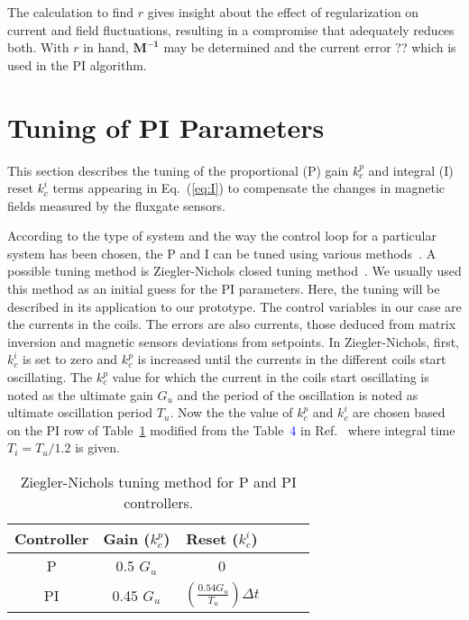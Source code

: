 The calculation to find $r$ gives insight about the effect of regularization on current and field fluctuations, resulting in a compromise that adequately reduces both. With $r$ in hand, $\bm{M^{-1}}$ may be determined and the current error  ?? which is used in the PI algorithm.

\section{Tuning of PI Parameters}\label{sec:tune}
This section describes the tuning of the proportional (P) gain $k_c^p$ and integral (I) reset $k_c^i$ terms appearing in Eq.~(\ref{eq:I}) to compensate the changes in magnetic fields measured by the fluxgate sensors.

According to the type of system and the way the control loop for a particular system has been chosen, the P and I can be tuned using various methods~\cite{tuning}. A possible tuning method is Ziegler-Nichols closed tuning method~\cite{tuning_ZN}. We usually used this method as an initial guess for the PI parameters. Here, the tuning will be described in its application to our prototype. The control variables in our case are the currents in the coils. The errors are also currents, those deduced from matrix inversion and magnetic sensors deviations from setpoints. In Ziegler-Nichols, first, $k_c^i$ is set to zero and $k_c^p$ is increased until the currents in the different coils start oscillating. The $k_c^p$ value for which the current in the coils start oscillating is noted as the ultimate gain $G_{u}$ and the period of the oscillation is noted as ultimate oscillation period $T_u$. Now the the value of $k_c^p$ and $k_c^i$ are chosen based on the PI row of Table~\ref{table:tuning} modified from the Table~\textcolor{blue}{4} in Ref.~\cite{tuning_formula} where integral time $T_i=T_u/1.2$ is given. 

\begin{table} [htb!]
    \centering
    \begin{tabular} { |c|c|c|c|c|c|} 
        \hline
        Controller & Gain ($k_c^p$) & Reset ($k_c^i$)\\
        \hline\hline
         P & 0.5 $G_u$ & 0 \\ 
        \hline
         PI & 0.45 $G_u$ & $\left(\frac{\text{0.54} G_u}{T_u}\right)\Delta t$ \\ 
        \hline
    \end{tabular}
    \caption{Ziegler-Nichols tuning method for P and PI controllers.}\label{table:tuning}
\end{table}

